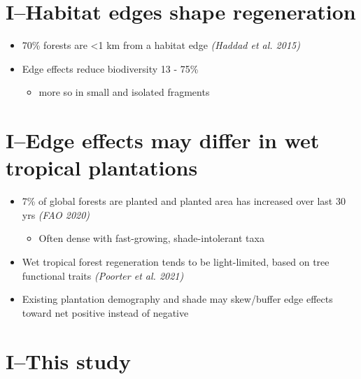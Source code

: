 \documentclass[
]{article}
\providecommand{\tightlist}{%
  \setlength{\itemsep}{0pt}\setlength{\parskip}{0pt}}
\begin{document}
\hypertarget{ihabitat-edges-shape-regeneration}{%
\section{I--Habitat edges shape
regeneration}\label{ihabitat-edges-shape-regeneration}}

\begin{itemize}
\item
  70\% forests are \textless1 km from a habitat edge \emph{(Haddad et
  al. 2015)}
\item
  Edge effects reduce biodiversity 13 - 75\%

  \begin{itemize}
  \tightlist
  \item
    more so in small and isolated fragments
  \end{itemize}
\end{itemize}

\hypertarget{iedge-effects-may-differ-in-wet-tropical-plantations}{%
\section{I--Edge effects may differ in wet tropical
plantations}\label{iedge-effects-may-differ-in-wet-tropical-plantations}}

\begin{itemize}
\item
  7\% of global forests are planted and planted area has increased over
  last 30 yrs \emph{(FAO 2020)}

  \begin{itemize}
  \tightlist
  \item
    Often dense with fast-growing, shade-intolerant taxa
  \end{itemize}
\item
  Wet tropical forest regeneration tends to be light-limited, based on
  tree functional traits \emph{(Poorter et al. 2021)}
\item
  Existing plantation demography and shade may skew/buffer edge effects
  toward net positive instead of negative
\end{itemize}

\hypertarget{ithis-study}{%
\section{I--This study}\label{ithis-study}}
\end{document}
